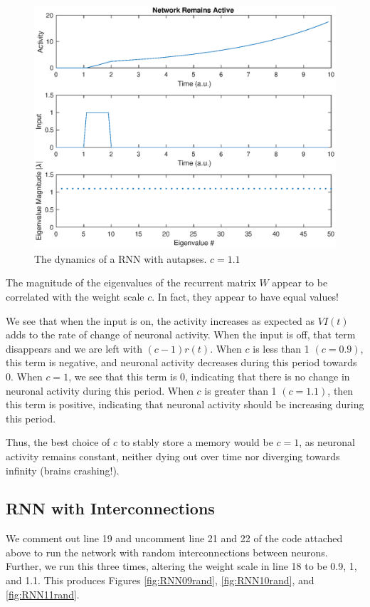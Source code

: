 \documentclass[11pt, oneside]{article}
\begin{document}
\begin{figure}[H]
\includegraphics[width=1\textwidth]{RNN11.eps}
\caption{The dynamics of a RNN with autapses. $c = 1.1$}
\label{fig:RNN11}
\end{figure}

The magnitude of the eigenvalues of the recurrent matrix $W$ appear to be correlated with the weight scale $c$. In fact, they appear to have equal values!

We see that when the input is on, the activity increases as expected as $VI(t)$ adds to the rate of change of neuronal activity. When the input is off, that term disappears and we are left with $(c-1)r(t)$. When $c$ is less than 1 $(c=0.9)$, this term is negative, and neuronal activity decreases during this period towards 0. When $c = 1$, we see that this term is 0, indicating that there is no change in neuronal activity during this period. When $c$ is greater than 1 $(c=1.1)$, then this term is positive, indicating that neuronal activity should be increasing during this period.

Thus, the best choice of $c$ to stably store a memory would be $c=1$, as neuronal activity remains constant, neither dying out over time nor diverging towards infinity (brains crashing!).

\subsection{RNN with Interconnections}

We comment out line 19 and uncomment line 21 and 22 of the code attached above to run the network with random interconnections between neurons. Further, we run this three times, altering the weight scale in line 18 to be 0.9, 1, and 1.1. This produces Figures \ref{fig:RNN09rand}, \ref{fig:RNN10rand}, and \ref{fig:RNN11rand}.
\end{document}
